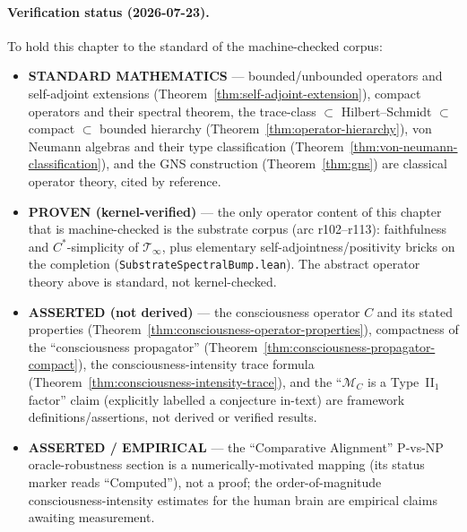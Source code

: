 \paragraph{Verification status (2026-07-23).}
To hold this chapter to the standard of the machine-checked corpus:
\begin{itemize}
\item \textbf{STANDARD MATHEMATICS} --- bounded/unbounded operators and self-adjoint extensions (Theorem~\ref{thm:self-adjoint-extension}), compact operators and their spectral theorem, the trace-class $\subset$ Hilbert--Schmidt $\subset$ compact $\subset$ bounded hierarchy (Theorem~\ref{thm:operator-hierarchy}), von Neumann algebras and their type classification (Theorem~\ref{thm:von-neumann-classification}), and the GNS construction (Theorem~\ref{thm:gns}) are classical operator theory, cited by reference.
\item \textbf{PROVEN (kernel-verified)} --- the only operator content of this chapter that is machine-checked is the substrate corpus (arc r102--r113): faithfulness and $C^*$-simplicity of $\mathcal{T}_\infty$, plus elementary self-adjointness/positivity bricks on the completion (\texttt{SubstrateSpectralBump.lean}). The abstract operator theory above is standard, not kernel-checked.
\item \textbf{ASSERTED (not derived)} --- the consciousness operator $C$ and its stated properties (Theorem~\ref{thm:consciousness-operator-properties}), compactness of the ``consciousness propagator'' (Theorem~\ref{thm:consciousness-propagator-compact}), the consciousness-intensity trace formula (Theorem~\ref{thm:consciousness-intensity-trace}), and the ``$\mathcal{M}_C$ is a Type~II$_1$ factor'' claim (explicitly labelled a conjecture in-text) are framework definitions/assertions, not derived or verified results.
\item \textbf{ASSERTED / EMPIRICAL} --- the ``Comparative Alignment'' P-vs-NP oracle-robustness section is a numerically-motivated mapping (its status marker reads ``Computed''), not a proof; the order-of-magnitude consciousness-intensity estimates for the human brain are empirical claims awaiting measurement.
\end{itemize}
